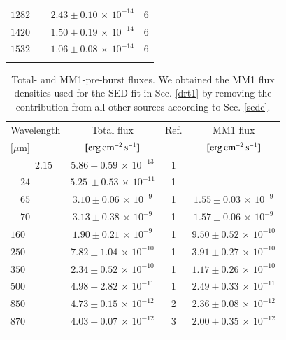 \begin{appendix}
\begin{table}
\begin{threeparttable}[b]
\begin{tabular*}{8.5cm}{@{\hspace{1.25cm}}ccc}
$ 1282~~~~~ $ & $ 2.43 \pm 0.10\,{\times}\,10^{-14}$  & 6 \\
$ 1420~~~~~ $ & $ 1.50 \pm 0.19\,{\times}\,10^{-14}$  & 6 \\
$ 1532~~~~~ $ & $ 1.06 \pm 0.08\,{\times}\,10^{-14}$  & 6 \\
\noalign{\smallskip}
\hline
\end{tabular*}
\end{threeparttable}
\end{table}

\begin{table}
\caption[]{Total- and MM1-pre-burst fluxes. We obtained the MM1 flux densities used for the SED-fit in Sec. \ref{drt1} by removing the contribution from all other sources 
according to Sec. \ref{sedc}.}
\label{tab: preSED}
\begin{tabular}{p{1.25cm} ccc}
\hline
\noalign{\smallskip}
Wavelength & Total flux & Ref. & MM1 flux \\
$[\mu$m] & $[{\rm erg \, cm^{-2} \, s^{-1}}]$ & &$[{\rm erg \, cm^{-2}\, s^{-1}}]$ \\
\noalign{\smallskip}
\hline
\noalign{\smallskip}
~~~~~$2.15$\tablefootmark{*} & $5.86 \pm 0.59\,{\times}\,10^{-13}$& 1 & \\
~~$24$\tablefootmark{*} & $5.25\,{\pm} 0.53\,{\times}\,10^{-11}$  & 1 & \\
~~$65$ & $3.10 \pm 0.06\,{\times}\,10^{-9} $  & 1 & $1.55 \pm 0.03\,{\times}\,10^{-9}$ \\
~~$70$ & $3.13 \pm 0.38\,{\times}\,10^{-9} $  & 1 & $1.57 \pm 0.06\,{\times}\,10^{-9}$ \\
$160$ & $1.90 \pm 0.21\,{\times}\,10^{-9} $  & 1 & $9.50 \pm 0.52\,{\times}\,10^{-10}$ \\
$250$ & $7.82 \pm 1.04\,{\times}\,10^{-10} $  & 1 & $3.91 \pm 0.27\,{\times}\,10^{-10}$ \\
$350$ & $2.34 \pm 0.52\,{\times}\,10^{-10} $  & 1 & $1.17 \pm 0.26\,{\times}\,10^{-10}$ \\
$500$ & $4.98 \pm 2.82\,{\times}\,10^{-11} $  & 1 & $2.49 \pm 0.33\,{\times}\,10^{-11}$ \\
$850$ & $ 4.73\pm 0.15\,{\times}\,10^{-12} $  & 2 & $2.36 \pm 0.08\,{\times}\,10^{-12}$\\ 
$870$ & $4.03 \pm 0.07\,{\times}\,10^{-12} $  & 3 & $2.00 \pm 0.35\,{\times}\,10^{-12}$ \\
\noalign{\smallskip}
\hline
\end{tabular}


\end{table}
\end{appendix}
